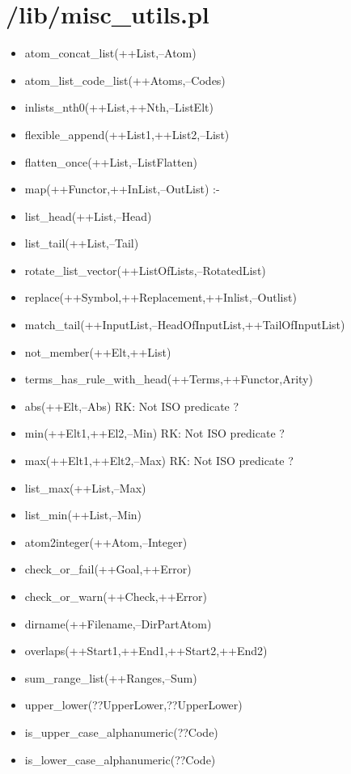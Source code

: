 \section{/lib/misc\_utils.pl}
%
\begin{itemize}
\item atom\_concat\_list(++List,--Atom)
\item atom\_list\_code\_list(++Atoms,--Codes)
\item inlists\_nth0(++List,++Nth,--ListElt)
\item flexible\_append(++List1,++List2,--List)
\item flatten\_once(++List,--ListFlatten)
\item map(++Functor,++InList,--OutList) :-
\item list\_head(++List,--Head)
\item list\_tail(++List,--Tail)
\item rotate\_list\_vector(++ListOfLists,--RotatedList) 
\item replace(++Symbol,++Replacement,++Inlist,--Outlist)
\item match\_tail(++InputList,--HeadOfInputList,++TailOfInputList)
\item not\_member(++Elt,++List)
\item terms\_has\_rule\_with\_head(++Terms,++Functor,Arity)
\item abs(++Elt,--Abs)  RK: Not ISO predicate ?        
\item min(++Elt1,++El2,--Min)   RK: Not ISO predicate ?
\item max(++Elt1,++Elt2,--Max)  RK: Not ISO predicate ?
\item list\_max(++List,--Max)
\item list\_min(++List,--Min)
\item atom2integer(++Atom,--Integer)
\item check\_or\_fail(++Goal,++Error)
\item check\_or\_warn(++Check,++Error)
\item dirname(++Filename,--DirPartAtom)
\item overlaps(++Start1,++End1,++Start2,++End2)
\item sum\_range\_list(++Ranges,--Sum)
\item upper\_lower(??UpperLower,??UpperLower)
\item is\_upper\_case\_alphanumeric(??Code)
\item is\_lower\_case\_alphanumeric(??Code)
\end{itemize}


